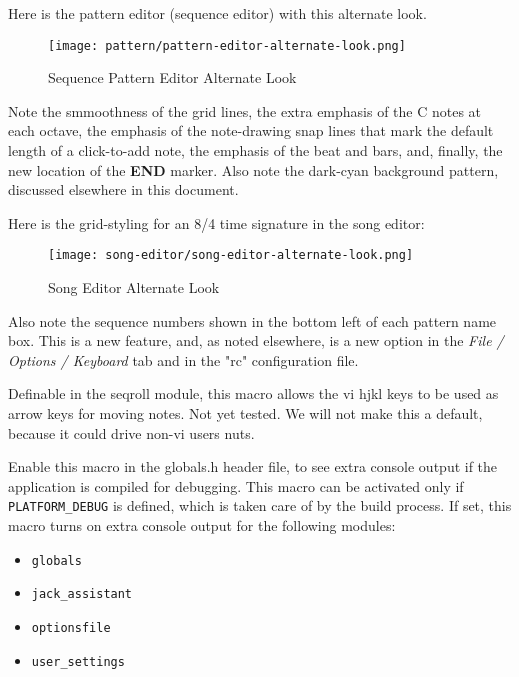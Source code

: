        Here is the pattern editor (sequence editor) with this alternate look.

\begin{figure}[H]
   \centering 
   \texttt{[image: pattern/pattern-editor-alternate-look.png]}
   \caption{Sequence Pattern Editor Alternate Look}
   \label{fig:seq64_pattern_editor_alternate_look}
\end{figure}

        Note the smmoothness of the grid lines, the extra emphasis of the C
        notes at each octave, the emphasis of the note-drawing snap lines that
        mark the default length of a click-to-add note, the emphasis of the
        beat and bars, and, finally, the new location of the
        \textbf{END} marker.  Also note the dark-cyan background pattern,
        discussed elsewhere in this document.

        Here is the grid-styling for an 8/4 time signature in the song editor:

\begin{figure}[H]
   \centering 
   \texttt{[image: song-editor/song-editor-alternate-look.png]}
   \caption{Song Editor Alternate Look}
   \label{fig:seq64_song_editor_alternate_look}
\end{figure}

      Also note the sequence numbers shown in the bottom left of each pattern
      name box. This is a new feature, and, as noted elsewhere, is a new
      option in the \textsl{File / Options / Keyboard} tab and in
      the "rc" configuration file.

        Definable in the seqroll module, this macro allows the vi hjkl keys to
        be used as arrow keys for moving notes.  Not yet tested.  We will not
        make this a default, because it could drive non-vi users nuts.

        Enable this macro in the globals.h header file, to see extra console
        output if the application is compiled for debugging.  This macro can be
        activated only if \texttt{PLATFORM\_DEBUG} is defined, which is taken
        care of by the build process.  If set, this macro turns on extra
        console output for the following modules:

        \begin{itemize}
           \item \texttt{globals}
           \item \texttt{jack\_assistant}
           \item \texttt{optionsfile}
           \item \texttt{user\_settings}
        \end{itemize}

